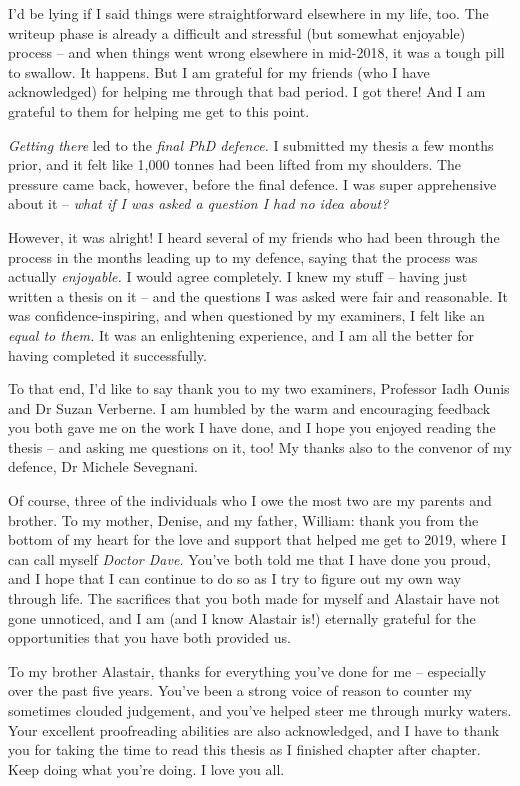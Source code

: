 \begin{preamble}
I'd be lying if I said things were straightforward elsewhere in my life, too. The writeup phase is already a difficult and stressful (but somewhat enjoyable) process -- and when things went wrong elsewhere in mid-2018, it was a tough pill to swallow. It happens. But I am grateful for my friends (who I have acknowledged) for helping me through that bad period. I got there! And I am grateful to them for helping me get to this point.

\emph{Getting there} led to the \emph{final PhD defence.} I submitted my thesis a few months prior, and it felt like 1,000 tonnes had been lifted from my shoulders. The pressure came back, however, before the final defence. I was super apprehensive about it -- \emph{what if I was asked a question I had no idea about?}

However, it was alright! I heard several of my friends who had been through the process in the months leading up to my defence, saying that the process was actually \emph{enjoyable.} I would agree completely. I knew my stuff -- having just written a thesis on it -- and the questions I was asked were fair and reasonable. It was confidence-inspiring, and when questioned by my examiners, I felt like an \emph{equal to them.} It was an enlightening experience, and I am all the better for having completed it successfully.

To that end, I'd like to say thank you to my two examiners, Professor Iadh Ounis and Dr Suzan Verberne. I am humbled by the warm and encouraging feedback you both gave me on the work I have done, and I hope you enjoyed reading the thesis -- and asking me questions on it, too! My thanks also to the convenor of my defence, Dr Michele Sevegnani.

Of course, three of the individuals who I owe the most two are my parents and brother. To my mother, Denise, and my father, William: thank you from the bottom of my heart for the love and support that helped me get to 2019, where I can call myself \emph{Doctor Dave.} You've both told me that I have done you proud, and I hope that I can continue to do so as I try to figure out my own way through life. The sacrifices that you both made for myself and Alastair have not gone unnoticed, and I am (and I know Alastair is!) eternally grateful for the opportunities that you have both provided us.

To my brother Alastair, thanks for everything you've done for me -- especially over the past five years. You've been a strong voice of reason to counter my sometimes clouded judgement, and you've helped steer me through murky waters. Your excellent proofreading abilities are also acknowledged, and I have to thank you for taking the time to read this thesis as I finished chapter after chapter. Keep doing what you're doing. I love you all.


\end{preamble}
